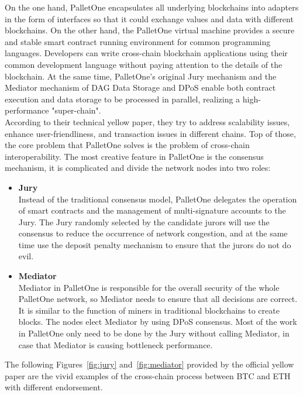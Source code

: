 \noindent On the one hand, PalletOne encapsulates all underlying blockchains into adapters in the form of interfaces so that it could exchange values and data with different blockchains. On the other hand, the PalletOne virtual machine provides a secure and stable smart contract running environment for common programming languages. Developers can write cross-chain blockchain applications using their common development language without paying attention to the details of the blockchain. At the same time, PalletOne's original Jury mechanism and the Mediator mechanism of DAG Data Storage and DPoS enable both contract execution and data storage to be processed in parallel, realizing a high-performance "super-chain".\\

\noindent According to their technical yellow paper, they try to address scalability issues, enhance user-friendliness, and transaction issues in different chains. Top of those, the core problem that PalletOne solves is the problem of cross-chain interoperability. The most creative feature in PalletOne is the consensus mechanism, it is complicated and divide the network nodes into two roles:
\begin{itemize}
    \item \textbf{Jury} \\
    Instead of the traditional consensus model, PalletOne delegates the operation of smart contracts and the management of multi-signature accounts to the Jury. The Jury randomly selected by the candidate jurors will use the consensus to reduce the occurrence of network congestion, and at the same time use the deposit penalty mechanism to ensure that the jurors do not do evil.
    \item \textbf{Mediator}\\
    Mediator in PalletOne is responsible for the overall security of the whole PalletOne network, so Mediator needs to ensure that all decisions are correct. It is similar to the function of miners in traditional blockchains to create blocks. The nodes elect Mediator by using DPoS consensus. Most of the work in PalletOne only need to be done by the Jury without calling Mediator, in case that Mediator is causing bottleneck performance.
\end{itemize}
\noindent The following Figures~\ref{fig:jury} and~\ref{fig:mediator} provided by the official yellow paper are the vivid examples of the cross-chain process between BTC and ETH with different endorsement.

